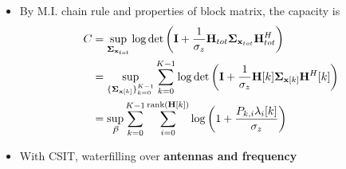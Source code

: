 \documentclass[xcolor=dvipsnames,aspectratio=169]{beamer}
\begin{document}
{\begin{itemize}
\item By M.I. chain rule and properties of block matrix, the capacity is
          \begin{equation}
            \begin{split}
                C&=\sup_{\mathbf{\boldsymbol{\Sigma}}_{\mathbf{x}_{tot}}}\log\det\left(\mathbf{I}+\frac{1}{\sigma_z}\mathbf{H}_{tot}\mathbf{\boldsymbol{\Sigma}}_{\mathbf{x}_{tot}}\mathbf{H}_{tot}^H\right)\\
                 &=\sup_{\{\mathbf{\boldsymbol{\Sigma}}_{\mathbf{x}[k]}\}_{k=0}^{K-1}}\sum_{k=0}^{K-1}\log\det\left(\mathbf{I}+\frac{1}{\sigma_z}\mathbf{H}[k]\mathbf{\boldsymbol{\Sigma}}_{\mathbf{x}[k]}\mathbf{H}^H[k]\right)\\
                 &=\sup_{\vec{P}}\sum_{k=0}^{K-1}\sum_{i=0}^{\textnormal{rank}(\mathbf{H}[k])}\log\left(1+\frac{P_{k,i}\lambda_i[k]}{\sigma_z}\right)
            \end{split}
          \end{equation}
     \item With CSIT, waterfilling over \textbf{antennas and frequency}
    \end{itemize}
}
\end{document}

